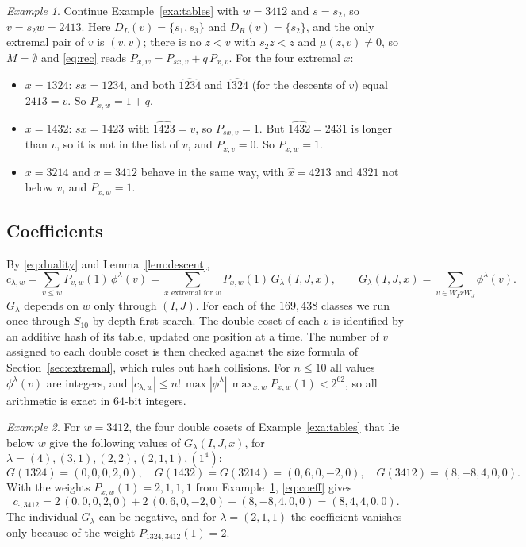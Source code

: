 \documentclass[11pt]{amsart}
\theoremstyle{definition}
\theoremstyle{remark}
\newtheorem{exa}{Example}[section]
\begin{document}
\begin{exa}\label{exa:recursion}
Continue Example~\ref{exa:tables} with $w=3412$ and $s=s_2$, so $v=s_2w=2413$. Here $D_L(v)=\{s_1,s_3\}$ and $D_R(v)=\{s_2\}$, and the only extremal pair of $v$ is $(v,v)$; there is no $z<v$ with $s_2z<z$ and $\mu(z,v)\ne0$, so $M=\emptyset$ and \eqref{eq:rec} reads $P_{x,w}=P_{sx,v}+q\,P_{x,v}$. For the four extremal $x$:
\begin{itemize}
\item $x=1324$: $sx=1234$, and both $\widehat{1234}$ and $\widehat{1324}$ (for the descents of $v$) equal $2413=v$. So $P_{x,w}=1+q$.
\item $x=1432$: $sx=1423$ with $\widehat{1423}=v$, so $P_{sx,v}=1$. But $\widehat{1432}=2431$ is longer than $v$, so it is not in the list of $v$, and $P_{x,v}=0$. So $P_{x,w}=1$.
\item $x=3214$ and $x=3412$ behave in the same way, with $\hat x=4213$ and $4321$ not below $v$, and $P_{x,w}=1$.
\end{itemize}
\end{exa}

\subsection{Coefficients}\label{sec:coeff}
By \eqref{eq:duality} and Lemma~\ref{lem:descent},
\begin{equation}\label{eq:coeff}
c_{\lambda,w}=\sum_{v\le w}P_{v,w}(1)\,\phi^\lambda(v)=\sum_{x\text{ extremal for }w}P_{x,w}(1)\,G_\lambda(I,J,x),\qquad G_\lambda(I,J,x)=\sum_{v\in W_IxW_J}\phi^\lambda(v).
\end{equation}
$G_\lambda$ depends on $w$ only through $(I,J)$. For each of the $169{,}438$ classes we run once through $S_{10}$ by depth-first search. The double coset of each $v$ is identified by an additive hash of its table, updated one position at a time. The number of $v$ assigned to each double coset is then checked against the size formula of Section~\ref{sec:extremal}, which rules out hash collisions. For $n\le10$ all values $\phi^\lambda(v)$ are integers, and $|c_{\lambda,w}|\le n!\,\max|\phi^\lambda|\,\max_{x,w}P_{x,w}(1)<2^{62}$, so all arithmetic is exact in $64$-bit integers.

\begin{exa}\label{exa:coeff}
For $w=3412$, the four double cosets of Example~\ref{exa:tables} that lie below $w$ give the following values of $G_\lambda(I,J,x)$, for $\lambda=(4),(3,1),(2,2),(2,1,1),(1^4)$:
\[
G(1324)=(0,0,0,2,0),\quad G(1432)=G(3214)=(0,6,0,-2,0),\quad G(3412)=(8,-8,4,0,0).
\]
With the weights $P_{x,w}(1)=2,1,1,1$ from Example~\ref{exa:recursion}, \eqref{eq:coeff} gives
\[
c_{\cdot,3412}=2\,(0,0,0,2,0)+2\,(0,6,0,-2,0)+(8,-8,4,0,0)=(8,4,4,0,0).
\]
The individual $G_\lambda$ can be negative, and for $\lambda=(2,1,1)$ the coefficient vanishes only because of the weight $P_{1324,3412}(1)=2$.
\end{exa}
\end{document}
